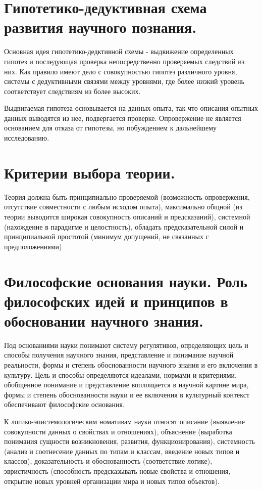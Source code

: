 \documentclass[12pt, specialist, subf, substylefile = spbu.rtx]{disser}
\begin{document}
\section{Гипотетико-дедуктивная схема развития научного познания.}
Основная идея гипотетико-дедктивной схемы - выдвижение определенных гипотез и последующая проверка непосредственно проверяемых следствий из них. Как правило имеют дело с совокупностью гипотез различного уровня, системы с дедуктивными связями между уровнями, где более низкий уровень соответствует следствиям из более высоких.

Выдвигаемая гипотеза основывается на данных опыта, так что описания опытных данных выводятся из нее, подвергается проверке. Опровержение не является основанием для отказа от гипотезы, но побуждением к дальнейшему исследованию.

\section{Критерии выбора теории.}
Теория должна быть принципиально проверяемой (возможность опровержения, отсутствие совместности с любым исходом опыта), максимально общной (из теории выводится широкая совокупность описаний и предсказаний), системной (нахождение в парадигме и целостность), обладать предсказательной силой и принципиальной простотой (минимум допущений, не связанных с предположениями)

\section{Философские основания науки. Роль философских идей и принципов в обосновании научного знания.}
Под основаниями науки понимают систему регулятивов, определяющих цель и способы получения научного знания, представление и понимание научной реальности, формы и степень обоснованности научного знания и его включения в культуру. Цель и способы определяются идеалами, нормами и критериями, обобщенное понимание и представление воплощается в научной картине мира, формы и степень обоснованности науки и ее включения в культурный контекст обеспечивают философские основания.

К логико-эпистемологическим номативам науки относят описание (выявление совокупности данных о свойствах и отношениях), объяснение (выработка понимания сущности возникновения, развития, функционирования), системность (анализ и соотнесение данных по типам и классам, введение новых типов и классов), доказательность и обоснованность (соответствие логике), эвристичность (способность предсказывать новые свойства и отношения, открытие новых уровней организации мира и новых типов объектов).
\end{document}
